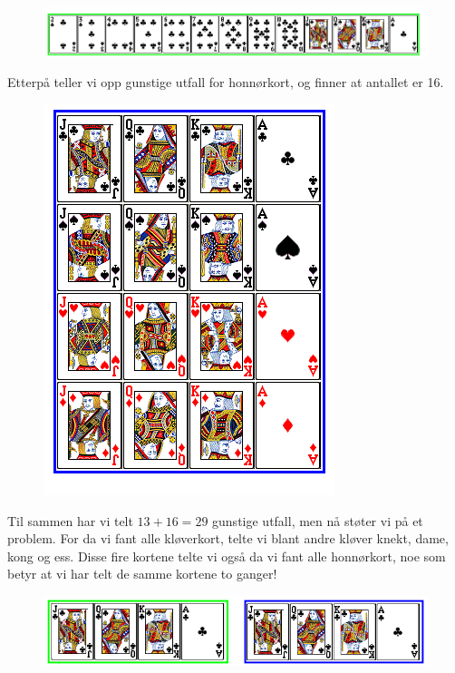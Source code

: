 \qquad
{}
	
	\begin{figure}[H]
		\centering
		\includegraphics[scale=0.45]{kort1}
	\end{figure}
	Etterpå teller vi opp gunstige utfall for honnørkort, og finner at 
	antallet er 16. \\
	\begin{figure}[H]
		\centering
		\includegraphics[scale=0.45]{kort2}
	\end{figure}
Til sammen har vi telt ${13+16=29}$ gunstige utfall, men nå støter vi på et problem. For da vi fant alle kløverkort, telte vi blant andre kløver knekt, dame, kong og ess. Disse fire kortene telte vi også da vi fant alle honnørkort, noe som betyr at vi har telt de samme kortene to ganger! \\
	\begin{figure}[H]
		\centering
		\includegraphics[scale=0.45]{kort4}
	\end{figure}
